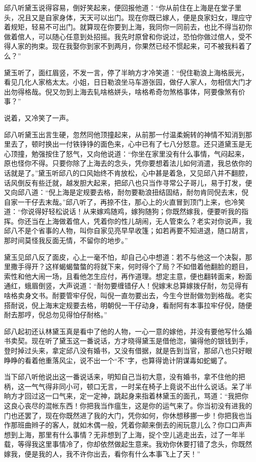 \documentclass[12pt,UTF8]{ctexbook}
\begin{document}
{{{邱八听黛玉说得容易，倒好笑起来，便回报他道：“你从前住在上海是在堂子里头，况且又是自家身体，天天可以出门。现在你既已嫁人，便是良家妇女，理应守着规矩，轻易不可出门。就算现在你要到上海，我同你一同前去，也比不得当初你做着倌人，可以随心任意到处招摇。我先时原曾和你说过，恐怕你做过倌人，受不得人家的拘束。现在我娶你到家不到两月，你果然已经不惯起来，可不被我料着了么？”

黛玉听了，面红眉竖，不发一言，停了半晌方才冷笑道：“倪住勒浪上海格辰光，看见几化人家格太太。小姐，日日勒浪坐马车游张园，做仔人家人，勿相信大门才出勿得格哉。倪又勿到上海去轧啥格姘头，啥格希奇勿煞格事体，阿要像煞有价事？”

说着，又冷笑了一声。

邱八听黛玉出言生硬，忽然同他顶撞起来，从前那一付温柔婉转的神情不知消到那里去了，顿时换出一付铁铮铮的面色来，心中已有了七八分怒意。还只道黛玉是无心顶撞，勉强按住了怒气，又向他说道：“你坐在家里没有什么事情，气闷起来，原也怪你不得。只要你除了上海去的念头，凭你要想着法儿如何消遣，我总依你的话就是了。”黛玉听邱八的口风始终不肯放松，心中甚是着急，又见邱八并不翻腔，话风倒反有些迁就，越发胆大起来，把邱八也只当作寻常公子哥儿，易于打发，便又向邱八道：“倪上海是定规要去格，耐勿要勒浪扭结固结，耐勿肯同倪去末，倪自家一干仔去末哉。”邱八听了，再捺不住，那心上的火直冒到顶门上来，也冷笑道：“你说得好轻松说话！从来嫁鸡随鸡，嫁狗随狗；你既然嫁我，便要听我的指挥。你还当在上海做着倌人，凭着你的性儿胡闹，无人管束么？老实对你说声，我邱八不是个省事的人物，叫你自家见亮早早收篷；如若再要不知进退，随口胡言，那时间莫怪我反面无情，不留你的地步。”

黛玉见邱八反了面皮，心上一毫不怕，却自己心中想道：若不与他这一个决裂，那里撒手得开？这样蝎蝎螫螫的将就下来，何时得个了局？不如借着他翻脸的题目，索性和他大闹一场，且看他怎生应付，再作道理。想定主意，便也翻转面来，粉面通红，蛾眉倒竖，大声说道：“耐勿要缠错仔人！倪嫁末总算嫁拨仔耐，勿见得有啥格卖身文书。耐要管牢仔倪，叫倪一直勿要出去，今生今世耐做勿到格哉。老实搭耐说，倪上海末定规要去格，明朝倪一干仔动身，看耐阿有本事拉牢仔倪，随便耐去那哼，倪总勿见得怕仔耐格。”

邱八起初还认林黛玉真是看中了他的人物，一心一意的嫁他，并没有要他写什么婚书卖契。现在听了黛玉这一番说话，方才晓得黛玉是借他淴，骗得他的银钱到手，登时掉过头来，拿定邱八没有婚书，又没有借据，就是告到当官，那邱八也只好眼睁睁的看着他重落风尘，说不出一个“不”字，也算得诡计阴谋毒如蛇蝎了。

当下邱八听他说出这一番说话来，明知自己当初大意，没有婚书，拿不住他的把柄，这一气气得非同小可，顿口无言，一时呆在椅子上竟说不出什么说话。呆了半晌方才回过这一口气来，定一定神，跳起身来指着林黛玉的面孔，骂道：“我把你这良心丧尽的混帐东西！你把我当作瘟生，这是你的运气来了。你当初没有进我的门也还罢了，现在你既然进了我的大门，凭你如何，你休想移挪一步！你把我也当作那班曲辫子的客人，就如木偶一般，凭着你颠来倒去的闹玩意儿么？你口口声声想到上海，那里有什么事情？无非想到了上海，捉个空儿逃走出去，过了一年半载，等得我这里事情冷了，你却依然做起生意来。我劝你休要打错了念头，你既然嫁我，便是我的人，我不许你出去，看你有什么本事飞上了天！”

}}}
\end{document}
